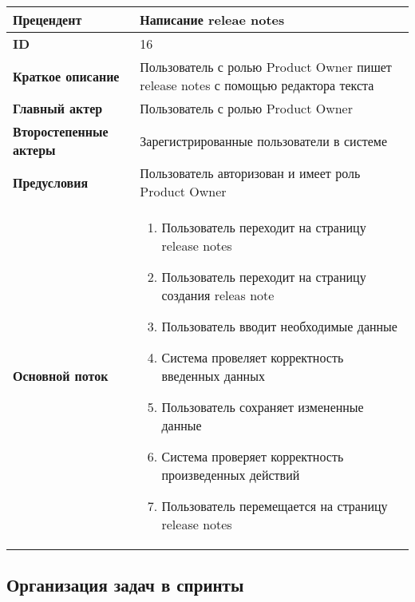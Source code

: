 \documentclass[14pt,a4paper]{extarticle}
\begin{document}
\begin{tabular}{|l|p{9cm}|}
	\hline
	\textbf{Прецендент}            & Написание releae notes                                                            \\
	\hline
	\textbf{ID}                    & 16                                                                                \\
	\hline
	\textbf{Краткое описание}      & Пользователь с ролью Product Owner пишет release notes с помощью редактора текста \\
	\hline
	\textbf{Главный актер}         & Пользователь с ролью Product Owner                                                \\
	\hline
	\textbf{Второстепенные актеры} & Зарегистрированные пользователи в системе                                         \\
	\hline
	\textbf{Предусловия}           & Пользователь авторизован и имеет роль Product Owner                               \\
	\hline
	\textbf{Основной поток}        & \begin{enumerate}
		                                 \item Пользователь переходит на страницу release notes
		                                 \item Пользователь переходит на страницу создания releas note
		                                 \item Пользователь вводит необходимые данные
		                                 \item Система провеляет корректность введенных данных
		                                 \item Пользователь сохраняет измененные данные
		                                 \item Система проверяет корректность произведенных действий
		                                 \item Пользователь перемещается на страницу release notes
	                                 \end{enumerate}                      \\
	\hline
\end{tabular}

\subsection{Организация задач в спринты}
\end{document}
